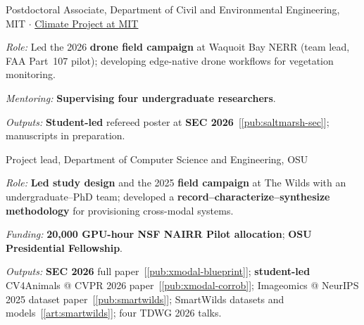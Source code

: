 {\small
\setlength{\parskip}{1pt}

%
{Postdoctoral Associate, Department of Civil and Environmental Engineering, MIT $\cdot$ \href{https://climateproject.mit.edu/}{Climate Project at MIT}}%
\begin{pbullets}
  \item \textit{Role:} Led the 2026 \textbf{drone field campaign} at Waquoit Bay NERR (team lead, FAA Part~107 pilot); developing edge-native drone workflows for vegetation monitoring.
  \item \textit{Mentoring:} \textbf{Supervising four undergraduate researchers}.
  \item \textit{Outputs:} \textbf{Student-led} refereed poster at \textbf{SEC 2026}~[\ref{pub:saltmarsh-sec}]; manuscripts in preparation.
\end{pbullets}
\vspace{4pt}

%
{Project lead, Department of Computer Science and Engineering, OSU}%
\begin{pbullets}
  \item \textit{Role:} \textbf{Led study design} and the 2025 \textbf{field campaign} at The Wilds with an undergraduate--PhD team; developed a \textbf{record--characterize--synthesize methodology} for provisioning cross-modal systems.
  \item \textit{Funding:} \textbf{20,000 GPU-hour NSF NAIRR Pilot allocation}; \textbf{OSU Presidential Fellowship}.
  \item \textit{Outputs:} \textbf{SEC 2026} full paper~[\ref{pub:xmodal-blueprint}]; \textbf{student-led} CV4Animals @ CVPR 2026 paper~[\ref{pub:xmodal-corrob}]; Imageomics @ NeurIPS 2025 dataset paper~[\ref{pub:smartwilds}]; SmartWilds datasets and models~[\ref{art:smartwilds}]; four TDWG 2026 talks.
\end{pbullets}
\vspace{4pt}

}

